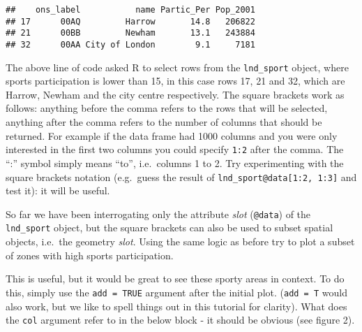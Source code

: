 \documentclass[]{article}
\newenvironment{Shaded}{}{}
\newcommand{\KeywordTok}[1]{\textcolor[rgb]{0.00,0.44,0.13}{\textbf{{#1}}}}
\newcommand{\DecValTok}[1]{\textcolor[rgb]{0.25,0.63,0.44}{{#1}}}
\newcommand{\StringTok}[1]{\textcolor[rgb]{0.25,0.44,0.63}{{#1}}}
\newcommand{\CommentTok}[1]{\textcolor[rgb]{0.38,0.63,0.69}{\textit{{#1}}}}
\newcommand{\NormalTok}[1]{{#1}}
\begin{document}
\begin{Shaded}
\end{Shaded}

\begin{verbatim}
##    ons_label           name Partic_Per Pop_2001
## 17      00AQ         Harrow       14.8   206822
## 21      00BB         Newham       13.1   243884
## 32      00AA City of London        9.1     7181
\end{verbatim}

The above line of code asked R to select rows from the
\texttt{lnd\_sport} object, where sports participation is lower than 15,
in this case rows 17, 21 and 32, which are Harrow, Newham and the city
centre respectively. The square brackets work as follows: anything
before the comma refers to the rows that will be selected, anything
after the comma refers to the number of columns that should be returned.
For example if the data frame had 1000 columns and you were only
interested in the first two columns you could specify \texttt{1:2} after
the comma. The ``:'' symbol simply means ``to'', i.e.~columns 1 to 2.
Try experimenting with the square brackets notation (e.g.~guess the
result of \texttt{lnd\_sport@data{[}1:2, 1:3{]}} and test it): it will
be useful.

So far we have been interrogating only the attribute \emph{slot}
(\texttt{@data}) of the \texttt{lnd\_sport} object, but the square
brackets can also be used to subset spatial objects, i.e.~the geometry
\emph{slot}. Using the same logic as before try to plot a subset of
zones with high sports participation.

\begin{Shaded}
\end{Shaded}

This is useful, but it would be great to see these sporty areas in
context. To do this, simply use the \texttt{add = TRUE} argument after
the initial plot. (\texttt{add = T} would also work, but we like to
spell things out in this tutorial for clarity). What does the
\texttt{col} argument refer to in the below block - it should be obvious
(see figure 2).
\end{document}
